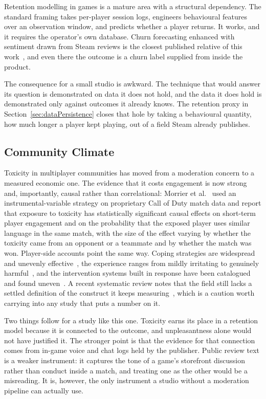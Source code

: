 \documentclass[sigconf]{acmart}
\begin{document}
Retention modelling in games is a mature area with a structural dependency. The standard framing
takes per-player session logs, engineers behavioural features over an observation window, and
predicts whether a player returns. It works, and it requires the operator's own database. Churn
forecasting enhanced with sentiment drawn from Steam reviews is the closest published relative of
this work~\cite{AbdulRahman2024}, and even there the outcome is a churn label supplied from inside
the product.

The consequence for a small studio is awkward. The technique that would answer its question is
demonstrated on data it does not hold, and the data it does hold is demonstrated only against
outcomes it already knows. The retention proxy in Section~\ref{sec:dataPersistence} closes that
hole by taking a behavioural quantity, how much longer a player kept playing, out of a field Steam
already publishes.

\subsection{Community Climate}

Toxicity in multiplayer communities has moved from a moderation concern to a measured economic one.
The evidence that it costs engagement is now strong and, importantly, causal rather than
correlational: Morrier et al.~\cite{Morrier2025} used an instrumental-variable strategy on
proprietary Call of Duty match data and report that exposure to toxicity has statistically
significant causal effects on short-term player engagement and on the probability that the exposed
player uses similar language in the same match, with the size of the effect varying by whether the
toxicity came from an opponent or a teammate and by whether the match was won. Player-side accounts
point the same way. Coping strategies are widespread and unevenly
effective~\cite{FrommelMandryk2024}, the experience ranges from mildly irritating to genuinely
harmful~\cite{LaatoKordyakaHamari2024}, and the intervention systems built in response have been
catalogued and found uneven~\cite{Wijkstra2024}. A recent systematic review notes that the field
still lacks a settled definition of the construct it keeps measuring~\cite{Kordyaka2025}, which is
a caution worth carrying into any study that puts a number on it.

Two things follow for a study like this one. Toxicity earns its place in a retention model because
it is connected to the outcome, and unpleasantness alone would not have justified it. The stronger
point is that the evidence for that connection comes from in-game voice and chat logs held by the
publisher. Public review text is a weaker instrument: it captures the tone of a game's storefront
discussion rather than conduct inside a match, and treating one as the other would be a misreading.
It is, however, the only instrument a studio without a moderation pipeline can actually use.
\end{document}
